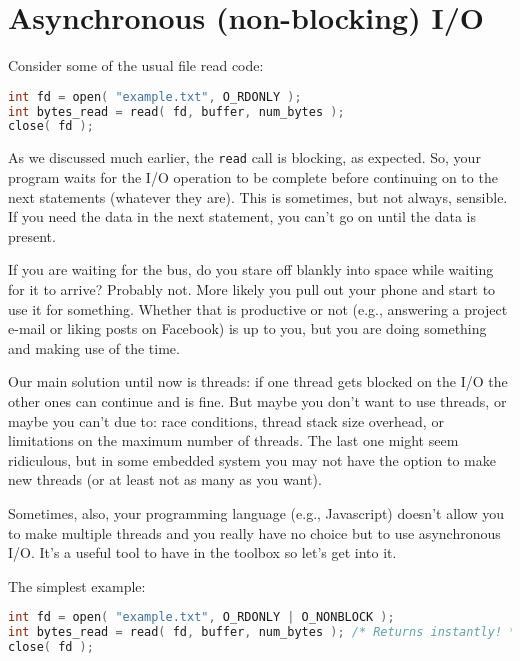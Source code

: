 




\section*{Asynchronous (non-blocking) I/O}
Consider some of the usual file read code:

\begin{lstlisting}[language=C]
int fd = open( "example.txt", O_RDONLY );
int bytes_read = read( fd, buffer, num_bytes );
close( fd );
\end{lstlisting}

As we discussed much earlier, the \texttt{read} call is blocking, as expected. So, your program waits for the I/O operation to be complete before continuing on to the next statements (whatever they are). This is sometimes, but not always, sensible. If you need the data in the next statement, you can't go on until the data is present.

If you are waiting for the bus, do you stare off blankly into space while waiting for it to arrive? Probably not. More likely you pull out your phone and start to use it for something. Whether that is productive or not (e.g., answering a project e-mail or liking posts on Facebook) is up to you, but you are doing something and making use of the time.

Our main solution until now is threads: if one thread gets blocked on the I/O the other ones can continue and is fine. But maybe you don't want to use threads, or maybe you can't due to: race conditions, thread stack size overhead, or limitations on the maximum number of threads. The last one might seem ridiculous, but in some embedded system you may not have the option to make new threads (or at least not as many as you want).

Sometimes, also, your programming language (e.g., Javascript) doesn't allow you to make multiple threads and you really have no choice but to use asynchronous I/O. It's a useful tool to have in the toolbox so let's get into it.

The simplest example:

\begin{lstlisting}[language=C]
int fd = open( "example.txt", O_RDONLY | O_NONBLOCK );
int bytes_read = read( fd, buffer, num_bytes ); /* Returns instantly! */
close( fd );
\end{lstlisting}

